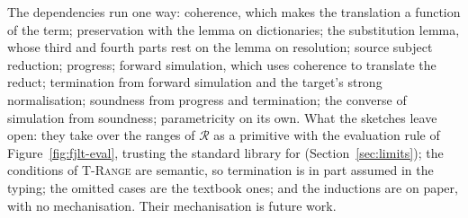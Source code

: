 The dependencies run one way: coherence, which makes the translation a function of the term; preservation with the lemma on dictionaries; the substitution lemma, whose third and fourth parts rest on the lemma on resolution; source subject reduction; progress; forward simulation, which uses coherence to translate the reduct; termination from forward simulation and the target's strong normalisation; soundness from progress and termination; the converse of simulation from soundness; parametricity on its own.
What the sketches leave open: they take  over the ranges of $\mathcal{R}$ as a primitive with the evaluation rule of Figure~\ref{fig:fjlt-eval}, trusting the standard library for  (Section~\ref{sec:limits}); the conditions of \textsc{T-Range} are semantic, so termination is in part assumed in the typing; the omitted cases are the textbook ones; and the inductions are on paper, with no mechanisation.
Their mechanisation is future work.

